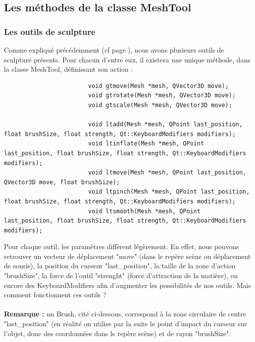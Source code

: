 \documentclass[a4paper]{memoir}
\begin{document}
			\subsection{Les méthodes de la classe MeshTool}
				\label{tool-dev}
				\subsubsection{Les outils de sculpture}
					Comme expliqué précédemment (cf page \pageref{tool-cdc}), nous avons plusieurs outils de sculpture présents. Pour chacun d'entre eux, 
					il existera une unique méthode, dans la classe MeshTool, définissant son action :
					\begin{verbatim}
						void gtmove(Mesh *mesh, QVector3D move);
						void gtrotate(Mesh *mesh, QVector3D move);
						void gtscale(Mesh *mesh, QVector3D move);

						void ltadd(Mesh *mesh, QPoint last_position, float brushSize, float strength, Qt::KeyboardModifiers modifiers);
						void ltinflate(Mesh *mesh, QPoint last_position, float brushSize, float strength, Qt::KeyboardModifiers modifiers);
						void ltmove(Mesh *mesh, QPoint last_position, QVector3D move, float brushSize);
						void ltpinch(Mesh *mesh, QPoint last_position, float brushSize, float strength, Qt::KeyboardModifiers modifiers);
						void ltsmooth(Mesh *mesh, QPoint last_position, float brushSize, float strength, Qt::KeyboardModifiers modifiers);
					\end{verbatim}
					Pour chaque outil, les paramètres diffèrent légèrement. En effet, nous pouvons retrouver un vecteur de déplacement "move" (dans le 
					repère scène ou déplacement de souris), la position du curseur "last\_position", la taille de la zone d'action "brushSize", la force de 
					l'outil "strenght" (force d'attraction de la matière), ou encore des KeyboardModifiers afin d'augmenter les possibilités de nos outils. 
					Mais comment fonctionnent ces outils ?\\\\
					\textbf{Remarque :} un Brush, cité ci-dessous, correspond à la zone circulaire de centre "last\_position" (en réalité on utilise par la 
					suite le point d'impact du curseur sur l'objet, donc des coordonnées dans le repère scène) et de rayon "brushSize".
\end{document}
